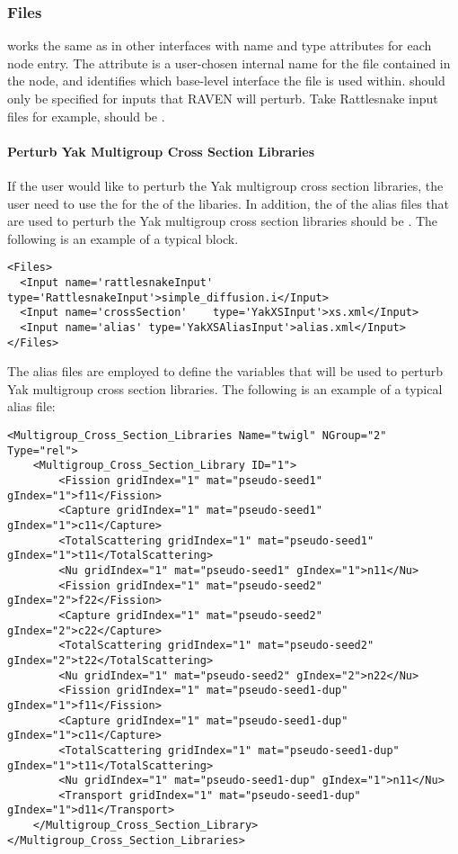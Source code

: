 \subsubsection{Files}
 works the same as in other interfaces with name and type
attributes for each node entry.  The  attribute is a user-chosen internal
name for the file contained in the node, and  identifies which base-level
interface the file is used within.   should only be specified for inputs
that RAVEN will perturb. Take Rattlesnake input files for example,  should
be .

\paragraph{Perturb Yak Multigroup Cross Section Libraries}
If the user would like to perturb the Yak multigroup cross section libraries, the user need to use the
 for the  of the libaries. In addition, the  of the
alias files that are used to perturb the Yak multigroup cross section libraries should be
. The following is an example of a typical  block.
%
\begin{lstlisting}[style=XML]
<Files>
  <Input name='rattlesnakeInput' type='RattlesnakeInput'>simple_diffusion.i</Input>
  <Input name='crossSection'    type='YakXSInput'>xs.xml</Input>
  <Input name='alias' type='YakXSAliasInput'>alias.xml</Input>
</Files>
\end{lstlisting}
%
The alias files are employed to define the variables that will be used to perturb Yak multigroup cross section
libraries. The following is an example of a typical alias file:
%
\begin{lstlisting}[style=XML]
<Multigroup_Cross_Section_Libraries Name="twigl" NGroup="2" Type="rel">
    <Multigroup_Cross_Section_Library ID="1">
        <Fission gridIndex="1" mat="pseudo-seed1" gIndex="1">f11</Fission>
        <Capture gridIndex="1" mat="pseudo-seed1" gIndex="1">c11</Capture>
        <TotalScattering gridIndex="1" mat="pseudo-seed1" gIndex="1">t11</TotalScattering>
        <Nu gridIndex="1" mat="pseudo-seed1" gIndex="1">n11</Nu>
        <Fission gridIndex="1" mat="pseudo-seed2" gIndex="2">f22</Fission>
        <Capture gridIndex="1" mat="pseudo-seed2" gIndex="2">c22</Capture>
        <TotalScattering gridIndex="1" mat="pseudo-seed2" gIndex="2">t22</TotalScattering>
        <Nu gridIndex="1" mat="pseudo-seed2" gIndex="2">n22</Nu>
        <Fission gridIndex="1" mat="pseudo-seed1-dup" gIndex="1">f11</Fission>
        <Capture gridIndex="1" mat="pseudo-seed1-dup" gIndex="1">c11</Capture>
        <TotalScattering gridIndex="1" mat="pseudo-seed1-dup" gIndex="1">t11</TotalScattering>
        <Nu gridIndex="1" mat="pseudo-seed1-dup" gIndex="1">n11</Nu>
        <Transport gridIndex="1" mat="pseudo-seed1-dup" gIndex="1">d11</Transport>
    </Multigroup_Cross_Section_Library>
</Multigroup_Cross_Section_Libraries>
\end{lstlisting}
